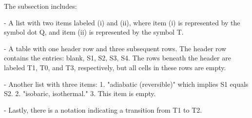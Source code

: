 The subsection includes:

- A list with two items labeled (i) and (ii), where item (i) is represented by the symbol dot Q, and item (ii) is represented by the symbol T.

- A table with one header row and three subsequent rows. The header row contains the entries: blank, S1, S2, S3, S4. The rows beneath the header are labeled T1, T0, and T3, respectively, but all cells in these rows are empty.

- Another list with three items:
  1. "adiabatic (reversible)" which implies S1 equals S2.
  2. "isobaric, isothermal."
  3. This item is empty.

- Lastly, there is a notation indicating a transition from T1 to T2.